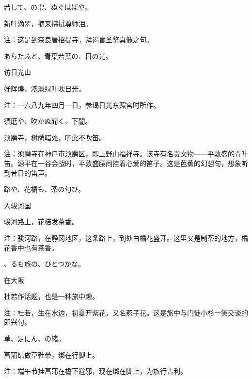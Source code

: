 \begin{haiku}
    {\FH 若して、の雫、ぬぐはばや。}

    {\FK 新叶滴翠，摘来拂拭尊师泪。}

    {\FT 注：这是到奈良唐招提寺，拜谒盲圣鉴真像之句。}
\end{haiku}

\begin{haiku}
    {\FH あらたふと、青葉若葉の、日の光。}

    {\FK 访日光山}

    {\FK 好辉煌，浓淡绿叶映日光。}

    {\FT 注：一六八九年四月一日，参谒日光东照宫时所作。}
\end{haiku}

\begin{haiku}
    {\FH 須磨や、吹かぬ聞く、下闇。}

    {\FK 须磨寺，树荫暗处，听此不吹笛。}

    {\FT 注：须磨寺在神户市须磨区，即上野山福祥寺。该寺有名贵文物——平敦盛的青叶笛。源平在一谷会战时，平敦盛腰间挂着心爱的笛子。这是芭蕉的幻想句，想象听到昔日的笛声。}
\end{haiku}

\begin{haiku}
    {\FH {}路や、花橘も、茶の匂ひ。}

    {\FK 入骏河国}

    {\FK 骏河路上，花桔发茶香。}

    {\FT 注：骏河路，在静冈地区，这条路上，到处白橘花盛开。这里又是制茶的地方，橘花香中也有茶香。}
\end{haiku}

\begin{haiku}
    {\FH {}、るも旅の、ひとつかな。}

    {\FK 在大阪}

    {\FK 杜若作话题，也是一种旅中趣。}

    {\FT 注：杜若，生在水边，初夏开紫花，又名燕子花。这是旅中与门徒小杉一笑交谈的即兴句。}
\end{haiku}

\begin{haiku}
    {\FH {}草、足にん、の緒。}

    {\FK 菖蒲结做草鞋带，绑在行脚上。}

    {\FT 注：端午节挂菖蒲在檐下避邪，现在绑在脚上，为旅行吉利。}
\end{haiku}

